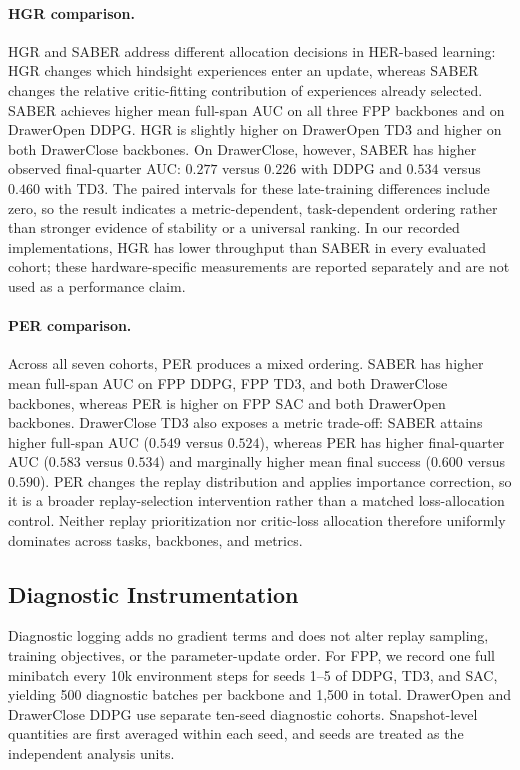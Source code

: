 \documentclass[letterpaper]{article}
\begin{document}
\paragraph{HGR comparison.}
HGR and SABER address different allocation decisions in HER-based learning: HGR changes which hindsight experiences enter an update, whereas SABER changes the relative critic-fitting contribution of experiences already selected. SABER achieves higher mean full-span AUC on all three FPP backbones and on DrawerOpen DDPG. HGR is slightly higher on DrawerOpen TD3 and higher on both DrawerClose backbones. On DrawerClose, however, SABER has higher observed final-quarter AUC: \(0.277\) versus \(0.226\) with DDPG and \(0.534\) versus \(0.460\) with TD3. The paired intervals for these late-training differences include zero, so the result indicates a metric-dependent, task-dependent ordering rather than stronger evidence of stability or a universal ranking. In our recorded implementations, HGR has lower throughput than SABER in every evaluated cohort; these hardware-specific measurements are reported separately and are not used as a performance claim.

\paragraph{PER comparison.}
Across all seven cohorts, PER produces a mixed ordering. SABER has higher mean full-span AUC on FPP DDPG, FPP TD3, and both DrawerClose backbones, whereas PER is higher on FPP SAC and both DrawerOpen backbones. DrawerClose TD3 also exposes a metric trade-off: SABER attains higher full-span AUC (\(0.549\) versus \(0.524\)), whereas PER has higher final-quarter AUC (\(0.583\) versus \(0.534\)) and marginally higher mean final success (\(0.600\) versus \(0.590\)). PER changes the replay distribution and applies importance correction, so it is a broader replay-selection intervention rather than a matched loss-allocation control. Neither replay prioritization nor critic-loss allocation therefore uniformly dominates across tasks, backbones, and metrics.

\subsection{Diagnostic Instrumentation}

Diagnostic logging adds no gradient terms and does not alter replay sampling, training objectives, or the parameter-update order. For FPP, we record one full minibatch every 10k environment steps for seeds 1--5 of DDPG, TD3, and SAC, yielding 500 diagnostic batches per backbone and 1,500 in total. DrawerOpen and DrawerClose DDPG use separate ten-seed diagnostic cohorts. Snapshot-level quantities are first averaged within each seed, and seeds are treated as the independent analysis units.
\end{document}
